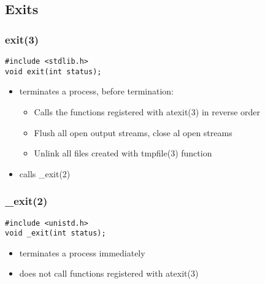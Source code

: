 \documentclass[10pt]{article}
\begin{document}
\begin{multicols}{2}
\begin{minipage}{\columnwidth}
        \subsection*{Exits}
        \subsubsection*{exit(3)}
        \begin{lstlisting}
#include <stdlib.h>
void exit(int status);
        \end{lstlisting}
        \begin{itemize}
            \setlength{\itemsep}{0em}
            \item terminates a process, before termination:
                  \begin{itemize}
                      \setlength{\itemsep}{-0em}
                      \item Calls the functions registered with atexit(3) in reverse order
                      \item Flush all open output streams, close al open streams
                      \item Unlink all files created with tmpfile(3) function
                  \end{itemize}
            \item calls \_exit(2)
        \end{itemize}
        \subsubsection*{\_exit(2)}
        \begin{lstlisting}
#include <unistd.h>
void _exit(int status);
        \end{lstlisting}
        \begin{itemize}
            \setlength{\itemsep}{-0em}
            \item terminates a process immediately
            \item does not call functions registered with atexit(3)
        \end{itemize}

\end{minipage}
\end{multicols}
\end{document}
